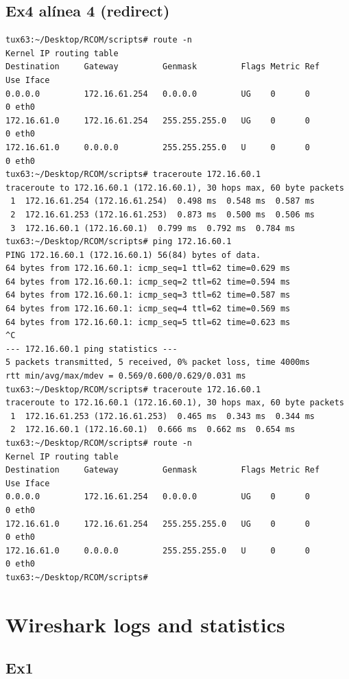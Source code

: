 \documentclass[11pt,a4paper,reqno]{report}
\numberwithin{equation}{section}
\begin{document}
\begin{appendices}
\section{Ex4 alínea 4 (redirect)}
\label{ex4_redirect}
\begin{lstlisting}[frame=single]
tux63:~/Desktop/RCOM/scripts# route -n
Kernel IP routing table
Destination     Gateway         Genmask         Flags Metric Ref    Use Iface
0.0.0.0         172.16.61.254   0.0.0.0         UG    0      0        0 eth0
172.16.61.0     172.16.61.254   255.255.255.0   UG    0      0        0 eth0
172.16.61.0     0.0.0.0         255.255.255.0   U     0      0        0 eth0
tux63:~/Desktop/RCOM/scripts# traceroute 172.16.60.1
traceroute to 172.16.60.1 (172.16.60.1), 30 hops max, 60 byte packets
 1  172.16.61.254 (172.16.61.254)  0.498 ms  0.548 ms  0.587 ms
 2  172.16.61.253 (172.16.61.253)  0.873 ms  0.500 ms  0.506 ms
 3  172.16.60.1 (172.16.60.1)  0.799 ms  0.792 ms  0.784 ms
tux63:~/Desktop/RCOM/scripts# ping 172.16.60.1
PING 172.16.60.1 (172.16.60.1) 56(84) bytes of data.
64 bytes from 172.16.60.1: icmp_seq=1 ttl=62 time=0.629 ms
64 bytes from 172.16.60.1: icmp_seq=2 ttl=62 time=0.594 ms
64 bytes from 172.16.60.1: icmp_seq=3 ttl=62 time=0.587 ms
64 bytes from 172.16.60.1: icmp_seq=4 ttl=62 time=0.569 ms
64 bytes from 172.16.60.1: icmp_seq=5 ttl=62 time=0.623 ms
^C
--- 172.16.60.1 ping statistics ---
5 packets transmitted, 5 received, 0% packet loss, time 4000ms
rtt min/avg/max/mdev = 0.569/0.600/0.629/0.031 ms
tux63:~/Desktop/RCOM/scripts# traceroute 172.16.60.1
traceroute to 172.16.60.1 (172.16.60.1), 30 hops max, 60 byte packets
 1  172.16.61.253 (172.16.61.253)  0.465 ms  0.343 ms  0.344 ms
 2  172.16.60.1 (172.16.60.1)  0.666 ms  0.662 ms  0.654 ms
tux63:~/Desktop/RCOM/scripts# route -n
Kernel IP routing table
Destination     Gateway         Genmask         Flags Metric Ref    Use Iface
0.0.0.0         172.16.61.254   0.0.0.0         UG    0      0        0 eth0
172.16.61.0     172.16.61.254   255.255.255.0   UG    0      0        0 eth0
172.16.61.0     0.0.0.0         255.255.255.0   U     0      0        0 eth0
tux63:~/Desktop/RCOM/scripts# 
\end{lstlisting}

\chapter{Wireshark logs and statistics}%

\section{Ex1}%
\label{ex1_headers}

\end{appendices}
\end{document}
